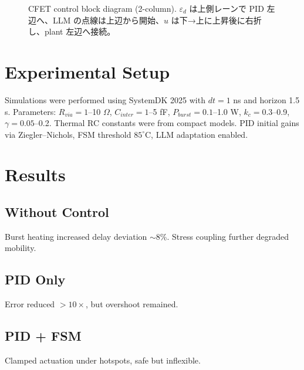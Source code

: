 \documentclass[conference]{IEEEtran}
\begin{document}
\begin{figure}[!t]
{%
}
\caption{CFET control block diagram (2-column). $\varepsilon_d$ は上側レーンで PID 左辺へ、LLM の点線は上辺から開始、$u$ は下→上に上昇後に右折し、plant 左辺へ接続。}
\label{fig:model_tikz}
\end{figure}

\section{Experimental Setup}
Simulations were performed using SystemDK 2025 with $dt=1$ ns and horizon 1.5 s. Parameters:  
$R_{via}=1$--10 $\Omega$, $C_{inter}=1$--5 fF, $P_{burst}=0.1$--1.0 W, $k_c=0.3$--0.9, $\gamma=0.05$--0.2.  
Thermal RC constants were from compact models. PID initial gains via Ziegler–Nichols, FSM threshold $85^\circ$C, LLM adaptation enabled.

\section{Results}
\subsection{Without Control}
Burst heating increased delay deviation $\sim$8\%. Stress coupling further degraded mobility.  
\subsection{PID Only}
Error reduced $>10\times$, but overshoot remained.  
\subsection{PID + FSM}
Clamped actuation under hotspots, safe but inflexible.  
\end{document}
